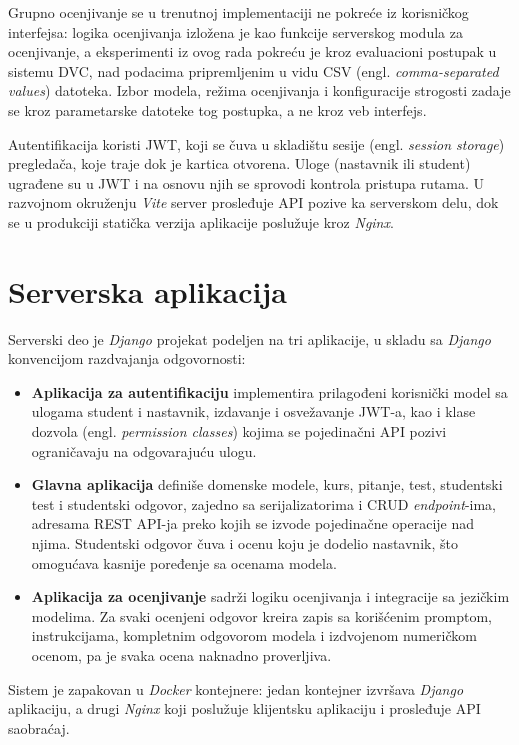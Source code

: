 Grupno ocenjivanje se u trenutnoj implementaciji ne pokreće iz korisničkog interfejsa:
logika ocenjivanja izložena je kao funkcije serverskog modula za ocenjivanje,
a eksperimenti iz ovog rada pokreću je kroz evaluacioni postupak u sistemu DVC,
nad podacima pripremljenim u vidu CSV (engl. \emph{comma-separated values}) datoteka.
Izbor modela, režima ocenjivanja i konfiguracije strogosti zadaje se kroz parametarske datoteke tog postupka, a ne kroz veb interfejs.

Autentifikacija koristi JWT, koji se čuva u skladištu sesije (engl. \emph{session storage}) pregledača, koje traje dok je kartica otvorena.
Uloge (nastavnik ili student) ugrađene su u JWT i na osnovu njih se sprovodi kontrola pristupa rutama.
U razvojnom okruženju \emph{Vite} server prosleđuje API pozive ka serverskom delu,
dok se u produkciji statička verzija aplikacije poslužuje kroz \emph{Nginx}.

\section{Serverska aplikacija}

Serverski deo je \emph{Django} projekat podeljen na tri aplikacije, u skladu sa \emph{Django} konvencijom razdvajanja odgovornosti:

\begin{itemize}
    \item \textbf{Aplikacija za autentifikaciju} implementira prilagođeni korisnički model sa ulogama student i nastavnik,
    izdavanje i osvežavanje JWT-a,
    kao i klase dozvola (engl. \emph{permission classes}) kojima se pojedinačni API pozivi ograničavaju na odgovarajuću ulogu.
    \item \textbf{Glavna aplikacija} definiše domenske modele, kurs, pitanje,
    test, studentski test i studentski odgovor,
    zajedno sa serijalizatorima i CRUD \emph{endpoint}-ima, adresama REST API-ja preko kojih se izvode pojedinačne operacije nad njima.
    Studentski odgovor čuva i ocenu koju je dodelio nastavnik, što omogućava kasnije poređenje sa ocenama modela.
    \item \textbf{Aplikacija za ocenjivanje} sadrži logiku ocenjivanja i integracije sa jezičkim modelima.
    Za svaki ocenjeni odgovor kreira zapis sa korišćenim promptom, instrukcijama,
    kompletnim odgovorom modela i izdvojenom numeričkom ocenom, pa je svaka ocena naknadno proverljiva.
\end{itemize}

Sistem je zapakovan u \emph{Docker} kontejnere: jedan kontejner izvršava \emph{Django} aplikaciju,
a drugi \emph{Nginx} koji poslužuje klijentsku aplikaciju i prosleđuje API saobraćaj.

